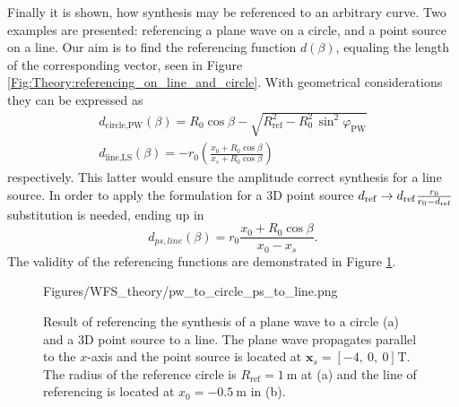 Finally it is shown, how synthesis may be referenced to an arbitrary curve. 
Two examples are presented: referencing a plane wave on a circle, and a point source on a line.
Our aim is to find the referencing function $d(\beta)$, equaling the length of the corresponding vector, seen in Figure \ref{Fig:Theory:referencing_on_line_and_circle}. With geometrical considerations they can be expressed as
\begin{eqnarray}
d_\text{circle,PW}(\beta) = R_0\cos \beta - \sqrt{ R_{\mathrm{ref}}^2 - R_0^2\,\sin^2\varphi_\text{PW} }
\\
d_\text{line,LS}(\beta) = -r_0 \left( \frac{x_0 + R_0\cos \beta}{x_s + R_0\cos \beta} \right)
\end{eqnarray}
respectively. 
This latter would ensure the amplitude correct synthesis for a line source. In order to apply the formulation for a 3D point source  $d_{\mathrm{ref}} \rightarrow d_{\mathrm{ref}} \frac{r_0}{r_0 - d_{\mathrm{ref}}}$ substitution is needed, ending up in
\begin{equation}
d_{ps,line}(\beta) = r_0 \frac{x_0 + R_0\cos \beta}{x_0-x_s}.
\end{equation}
The validity of the referencing functions are demonstrated in Figure \ref{Fig:Theory:pw_to_circle_ps_to_line}.
\begin{figure}
	\centering
	\begin{overpic}[width = 1\columnwidth]{Figures/WFS_theory/pw_to_circle_ps_to_line.png}
	\end{overpic}
\caption{ Result of referencing the synthesis of a plane wave to a circle (a) and a 3D point source to a line. The plane wave propagates parallel to the $x$-axis and the point source is located at $\mathbf{x}_s = [-4,\ 0,\ 0]^{}\mathrm{T}$. The radius of the reference circle is $R_{\mathrm{ref}} = 1~\mathrm{m}$ at (a) and the line of referencing is located at $x_0 = -0.5~\mathrm{m}$ in (b).}
	\label{Fig:Theory:pw_to_circle_ps_to_line}
\end{figure}
%
%
	
